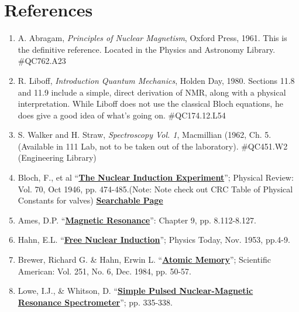 \documentclass{../lab}
\begin{document}
\section{References}

\begin{enumerate}
    \item A. Abragam, \emph{Principles of Nuclear Magnetism}, Oxford Press, 1961. This is the definitive reference.  Located in the Physics and Astronomy Library. \#QC762.A23

    \item R. Liboff, \emph{Introduction Quantum Mechanics}, Holden Day, 1980. Sections 11.8 and 11.9 include a simple, direct derivation of NMR, along with a physical interpretation. While Liboff does not use the classical Bloch equations, he does give a good idea of what's going on. \#QC174.12.L54

    \item S. Walker and H. Straw, \emph{Spectroscopy Vol. 1}, Macmillian (1962, Ch. 5. (Available in 111 Lab, not to be taken out of the laboratory). \#QC451.W2 (Engineering Library)

    \item Bloch, F., et al ``\href{http://prola.aps.org/abstract/PR/v70/i7-8/p474\_1}{\textbf{The Nuclear Induction Experiment}}''; Physical Review: Vol. 70, Oct 1946, pp. 474-485.(Note: Note check out CRC Table of Physical Constants for valves) \href{http://physics111.lib.berkeley.edu/Physics111/Reprints/NMR/04-The\_Nuclear\_Induction\_Experiment.pdf}{\textbf{Searchable Page}}

    \item Ames, D.P. ``\href{http://physics111.lib.berkeley.edu/Physics111/Reprints/NMR/05-Magnetic\_Resonance.pdf}{\textbf{Magnetic Resonance}}'': Chapter 9, pp. 8.112-8.127.

    \item Hahn, E.L. ``\href{http://link.aip.org/link/phtoad/v6/i11/p4}{\textbf{Free Nuclear Induction}}''; Physics Today, Nov. 1953, pp.4-9.

    \item Brewer, Richard G. \& Hahn, Erwin L. ``\href{http://physics111.lib.berkeley.edu/Physics111/Reprints/NMR/07-Atomic\_Memory.pdf}{\textbf{Atomic Memory}}''; Scientific American: Vol. 251, No. 6, Dec. 1984, pp. 50-57.

    \item Lowe, I.J., \& Whitson, D. ``\href{http://physics111.lib.berkeley.edu/Physics111/Reprints/NMR/08-Simple\_Pulsed\_NMR\_Spectrometer.pdf}{\textbf{Simple Pulsed Nuclear-Magnetic Resonance Spectrometer}}''; pp. 335-338.


\end{enumerate}
\end{document}
